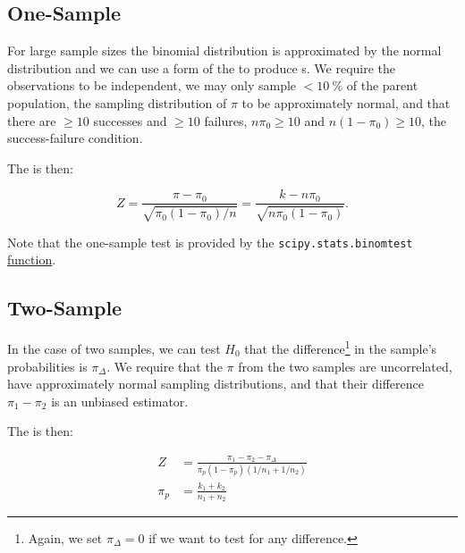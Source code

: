 \subsection{One-Sample}
\label{hypo:binomial_test:one}

For large sample sizes the binomial distribution is approximated by the normal distribution
and we can use a form of the \Ztest to produce {\pvalue}s.
We require the observations to be independent,
\ie we may only sample $< \SI{10}{\percent}$ of the parent population,
the sampling distribution of $\pi$ to be approximately normal,
and that there are $\geq 10$ successes and $\geq 10$ failures,
$n \pi_{0} \geq 10$ and $n \left(1-\pi_{0}\right) \geq 10$, \ie the success-failure condition.

The \Zscore is then:

\begin{equation}\label{eq:hypo:binomial_test:one}
Z = \frac{\pi - \pi_{0}}{\sqrt{\pi_{0}\left(1-\pi_{0}\right)/n}} = \frac{k - n \pi_{0}}{\sqrt{n\pi_{0}\left(1-\pi_{0}\right)}}.
\end{equation}

Note that the one-sample test is provided by the
\texttt{scipy.stats.binomtest} \href{https://docs.scipy.org/doc/scipy/reference/generated/scipy.stats.binomtest.html}{function}.

\subsection{Two-Sample}
\label{hypo:binomial_test:two}

In the case of two samples, we can test $H_{0}$
that the difference\footnote{Again, we set $\pi_{\Delta} = 0$ if we want to test for any difference.} in the sample's probabilities is $\pi_{\Delta}$.
We require that the $\pi$ from the two samples are uncorrelated,
have approximately normal sampling distributions,
and that their difference $\pi_{1} - \pi_{2}$ is an unbiased estimator.

The \Zscore is then:

\begin{subequations}\label{eq:hypo:binomial_test:two}
\begin{align}
Z &= \frac{\pi_{1} - \pi_{2} - \pi_{\Delta}}{\pi_{p} \left(1-\pi_{p}\right)\left(1/n_{1} + 1/n_{2}\right)} \label{eq:hypo:binomial_test:two:Z} \\
\pi_{p} &= \frac{k_{1} + k_{2}}{n_{1} + n_{2}} \label{eq:hypo:binomial_test:two:pi_p}
\end{align}
\end{subequations}

